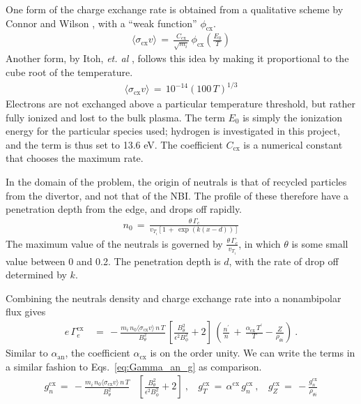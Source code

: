 One form of the charge exchange rate is obtained from a qualitative scheme by Connor and Wilson \cite{connor_review_2000}, with a ``weak function'' $\phi_\text{cx}$.
\begin{align} %
	\langle \sigma_\text{cx} v\rangle \,=\, \frac{C_\text{cx}}{\sqrt{m_i}} \,
		\phi_\text{cx}\left(\frac{E_0}{T}\right) \label{eq:connor_cx_rate}
\end{align}
Another form, by Itoh, \emph{et. al} \cite{itoh_model_1989}, follows this idea by making it proportional to the cube root of the temperature.
\begin{align} %
	\langle \sigma_\text{cx} v\rangle \,=\, 10^{-14}
		\left(100 \, T\right)^{1/3} \label{eq:itoh_cx_rate}
\end{align}
Electrons are not exchanged above a particular temperature threshold, but rather fully ionized and lost to the bulk plasma.
The term $E_0$ is simply the ionization energy for the particular species used; hydrogen is investigated in this project, and the term is thus set to 13.6 eV.
The coefficient $C_\text{cx}$ is a numerical constant that chooses the maximum rate.

In the domain of the problem, the origin of neutrals is that of recycled particles from the divertor, and not that of the NBI.
The profile of these therefore have a penetration depth from the edge, and drops off rapidly.
\begin{align} %
	n_0 \,=\, \frac{\theta\,\Gamma_c}{v_{T_i}\left[1 \,+\,
	\exp{(k(x - d))}\right]} \label{eq:neutral_density}
\end{align}
The maximum value of the neutrals is governed by $\frac{\theta\,\Gamma_c}{v_{T_i}}$, in which $\theta$ is some small value between 0 and 0.2.
The penetration depth is $d$, with the rate of drop off determined by $k$.

Combining the neutrals density and charge exchange rate into a nonambipolar flux gives
\begin{align} %
	e\,\Gamma_e^\text{cx} \,&=\,
		-\frac{m_i \,n_0 \langle\sigma_\text{cx} v\rangle \, n\,T}{B_\theta^2}
		\, \left[\frac{B_\theta^2}{\epsilon^2 B_\phi^2} + 2\right] \,
		\left(\frac{n^\prime}{n} \,+\, \frac{\alpha_\text{cx}\,T^\prime}
		{T} - \frac{Z}{\rho_{\theta i}}\right)~. \label{eq:Gamma_cx}
\end{align}
Similar to $\alpha_\text{an}$, the coefficient $\alpha_\text{cx}$ is on the order unity.
We can write the terms in a similar fashion to Eqs.~\ref{eq:Gamma_an_g} as comparison.
\begin{align} %
	g_n^\text{cx} \,=\, -\frac{m_i \,n_0 \langle\sigma_\text{cx} v\rangle \, n \, T}
		{B_\theta^2}& \left[\frac{B_\theta^2}{\epsilon^2 B_\phi^2} + 2\right]
		~,~~~~ g_T^\text{cx} \,=\, \alpha^\text{cx}\,g_n^\text{cx}~,~~~~
		g_Z^\text{cx} \,=\, -\frac{g_n^\text{cx}}{\rho_{\theta i}}
		\label{eq:g_cx}
\end{align}



